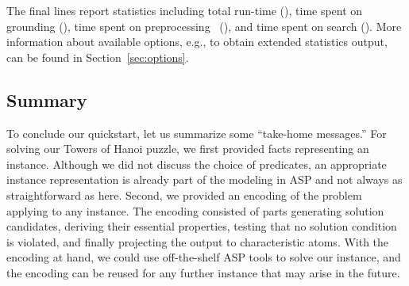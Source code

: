 The final lines report statistics including
total run-time (),
time spent on grounding (),
time spent on preprocessing~\cite{gekanesc08a} (),
and time spent on search ().
More information about available options, e.g.,
to obtain extended statistics output,
can be found in Section~\ref{sec:options}.

\subsection{Summary}

To conclude our quickstart, let us summarize some ``take-home messages.''
For solving our Towers of Hanoi puzzle, we first provided facts representing an instance.
Although we did not discuss the choice of predicates, an
appropriate instance representation is already part of the modeling in ASP and
not always as straightforward as here.
Second, we provided an encoding of the problem applying to any instance.
The encoding consisted of parts generating solution candidates,
deriving their essential properties,
testing that no solution condition is violated,
and finally projecting the output to characteristic atoms.
With the encoding at hand, we could use off-the-shelf ASP tools to solve our instance,
and the encoding can be reused for any further
instance that may arise in the future.

